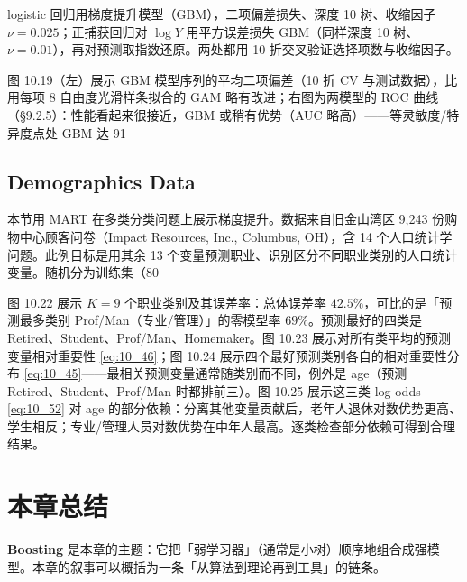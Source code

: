 logistic 回归用梯度提升模型（GBM），二项偏差损失、深度 10 树、收缩因子 $\nu = 0.025$；正捕获回归对 $\log Y$ 用平方误差损失 GBM（同样深度 10 树、$\nu = 0.01$），再对预测取指数还原。两处都用 10 折交叉验证选择项数与收缩因子。

图 10.19（左）展示 GBM 模型序列的平均二项偏差（10 折 CV 与测试数据），比用每项 8 自由度光滑样条拟合的 GAM 略有改进；右图为两模型的 ROC 曲线（§9.2.5）：性能看起来很接近，GBM 或稍有优势（AUC 略高）——等灵敏度/特异度点处 GBM 达 91%

\subsection{Demographics Data}

本节用 MART 在多类分类问题上展示梯度提升。数据来自旧金山湾区 9,243 份购物中心顾客问卷（Impact Resources, Inc., Columbus, OH），含 14 个人口统计学问题。此例目标是用其余 13 个变量预测职业、识别区分不同职业类别的人口统计变量。随机分为训练集（80%

图 10.22 展示 $K = 9$ 个职业类别及其误差率：总体误差率 $42.5\%$，可比的是「预测最多类别 Prof/Man（专业/管理）」的零模型率 $69\%$。预测最好的四类是 Retired、Student、Prof/Man、Homemaker。图 10.23 展示对所有类平均的预测变量相对重要性 \eqref{eq:10_46}；图 10.24 展示四个最好预测类别各自的相对重要性分布 \eqref{eq:10_45}——最相关预测变量通常随类别而不同，例外是 age（预测 Retired、Student、Prof/Man 时都排前三）。图 10.25 展示这三类 log-odds \eqref{eq:10_52} 对 age 的部分依赖：分离其他变量贡献后，老年人退休对数优势更高、学生相反；专业/管理人员对数优势在中年人最高。逐类检查部分依赖可得到合理结果。

\section{本章总结}

\textbf{Boosting} 是本章的主题：它把「弱学习器」（通常是小树）顺序地组合成强模型。本章的叙事可以概括为一条「从算法到理论再到工具」的链条。

